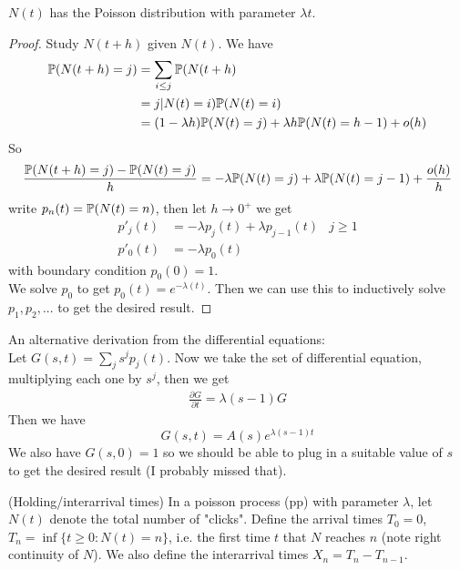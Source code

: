 \documentclass[a4paper]{article}
\begin{document}
\begin{thm}
$N(t)$ has the Poisson distribution with parameter $\lambda t$.
\begin{proof}
Study $N(t+h)$ given $N(t)$. We have 
\begin{equation*}
\begin{aligned}
\P(N(t+h) =j) &= \sum_{i\leq j} \P(N(t+h) \\
&= j|N(t) = i) \P(N(t) = i) \\
&= (1-\lambda h) \P(N(t) = j) + \lambda h \P(N(t) = h-1) + o(h)
\end{aligned}
\end{equation*}
So
\begin{equation*}
\begin{aligned}
\frac{\P(N(t+h)=j) - \P(N(t) = j)}{h} = -\lambda \P(N(t) = j) + \lambda \P (N(t) = j-1) + \frac{o(h)}{h}
\end{aligned}
\end{equation*}
write $p_n(t) = \P(N(t) = n)$, then let $h \to 0^+$ we get
\begin{equation*}
\begin{aligned}
p'_j(t) &= -\lambda p_j(t) + \lambda p_{j-1}(t) & j \geq 1\\
p'_0(t) &= -\lambda p_0(t) &
\end{aligned}
\end{equation*}
with boundary condition $p_0(0) = 1$.\\
We solve $p_0$ to get $p_0(t) = e^{-\lambda(t)}$. Then we can use this to inductively solve $p_1,p_2,...$ to get the desired result.
\end{proof}
\end{thm}

An alternative derivation from the differential equations:\\
Let $G(s,t) = \sum_j s^j p_j(t)$. Now we take the set of differential equation, multiplying each one by $s^j$, then we get
\begin{equation*}
\begin{aligned}
\frac{\partial G}{\partial t} = \lambda (s-1) G
\end{aligned}
\end{equation*}
Then we have $$G(s,t) = A(s) e^{\lambda (s-1) t}$$ We also have $G(s,0)=1$ so we should be able to plug in a suitable value of $s$ to get the desired result (I probably missed that).

\begin{defi}(Holding/interarrival times)
In a poisson process (pp) with parameter $\lambda$, let $N(t)$ denote the total number of "clicks". Define the arrival times $T_0 = 0$, $T_n = \inf \{t \geq 0: N(t) = n\}$, i.e. the first time $t$ that $N$ reaches $n$ (note right continuity of $N$). We also define the interarrival times $X_n = T_n - T_{n-1}$.
\end{defi}
\end{document}
